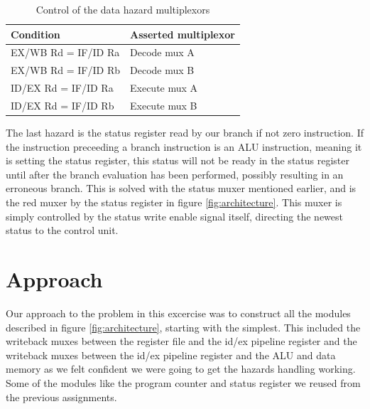 \documentclass[11pt]{report}
\begin{document}
\begin{table}[htbp]
  \centering
  \begin{tabular}{|l|l|}
    \hline
    Condition&Asserted multiplexor \\
    \hline
    EX/WB Rd = IF/ID Ra	& Decode mux A\\
    EX/WB Rd = IF/ID Rb	& Decode mux B\\
    ID/EX Rd = IF/ID Ra	& Execute mux A\\
    ID/EX Rd = IF/ID Rb	& Execute mux B\\
    \hline
    
  \end{tabular}
  \caption{Control of the data hazard multiplexors}
  \label{tab:hazmuxes}
\end{table}


The last hazard is the status register read by our branch if not zero instruction.
If the instruction preceeding a branch instruction is an ALU instruction, meaning it
is setting the status register, this status will not be ready in the status register
until after the branch evaluation has been performed, possibly resulting in an
erroneous branch. This is solved with the status muxer mentioned earlier, and is the 
red muxer by the status register in figure \ref{fig:architecture}.
This muxer is simply controlled by the status write enable signal itself, directing the
newest status to the control unit.


\section*{Approach}


Our approach to the problem in this excercise was to construct all the 
modules described in figure \ref{fig:architecture}, starting with the simplest.  %
This included the writeback muxes between the register file and the id/ex
pipeline register and the writeback muxes between the id/ex pipeline 
register and the ALU and data memory as we felt confident we were going 
to get the hazards handling working. 
Some of the modules like the program counter and status register 
we reused from the previous assignments.
\end{document}
